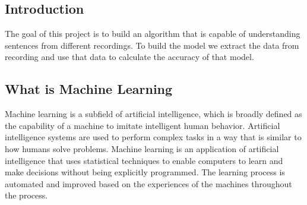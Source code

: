 \documentclass[english,12pt,oneside,a4paper]{article}
\begin{document}
\begin{center}
		\section{Introduction}
		The goal of this project is to build an algorithm that is capable of understanding sentences from different recordings. To build the model we extract the data from recording and use that data to calculate the accuracy of that model. 
		\subsection{What is Machine Learning}
		Machine learning is a subfield of artificial intelligence, which is broadly defined as the capability of a machine to imitate intelligent human behavior. Artificial intelligence systems are used to perform complex tasks in a way that is similar to how humans solve problems.
		Machine learning is an application of artificial intelligence that uses statistical techniques to enable computers to learn and make decisions without being explicitly programmed. The learning process is automated and improved based on the experiences of the machines throughout the process.

\end{center}
\end{document}
